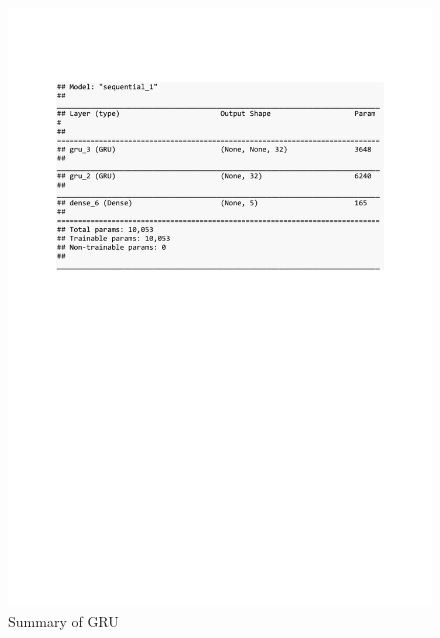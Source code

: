 \begin{figure}[h]
	\centering
	\includegraphics[scale=0.5]{Figures/summary_GRU_pred_syn}
	\decoRule
	\caption[Synthetic Anomalies]{Summary of GRU \parencite{own}}
	\label{fig:summary_GRU_pred_syn}
\end{figure}